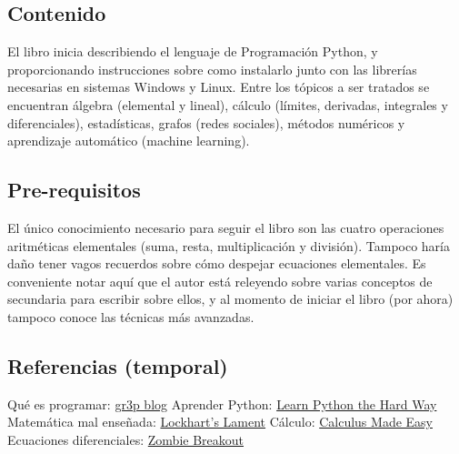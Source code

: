 \documentclass{article}
\begin{document}
\subsection{Contenido}

El libro inicia describiendo el lenguaje de Programación Python, y proporcionando instrucciones sobre como instalarlo junto con las librerías necesarias en sistemas Windows y Linux. Entre los tópicos a ser tratados se encuentran álgebra (elemental y lineal), cálculo (límites, derivadas, integrales y diferenciales), estadísticas, grafos (redes sociales), métodos numéricos y aprendizaje automático (machine learning).

\subsection{Pre-requisitos}

El único conocimiento necesario para seguir el libro son las cuatro operaciones
aritméticas elementales (suma, resta, multiplicación y división). Tampoco haría
daño tener vagos recuerdos sobre cómo despejar ecuaciones elementales. Es 
conveniente notar aquí que el autor está releyendo sobre varias conceptos de
secundaria para escribir sobre ellos, y al momento de iniciar el libro (por ahora)
tampoco conoce las técnicas más avanzadas.

\subsection{Referencias (temporal)}

Qué es programar: \href{http://gr3p.com/2012/10/que-es-programar-iii/}{gr3p blog}\newline
Aprender Python: \href{http://learnpythonthehardway.org/}{Learn Python the Hard Way}\newline
Matemática mal enseñada: \href{http://www.maa.org/devlin/lockhartslament.pdf}{Lockhart's Lament}\newline
Cálculo: \href{http://www.gutenberg.org/ebooks/33283}{Calculus Made Easy}\newline
Ecuaciones diferenciales: \href{http://mysite.science.uottawa.ca/rsmith43/Zombies.pdf}{Zombie Breakout}\newline

\label{end}
\end{document}
